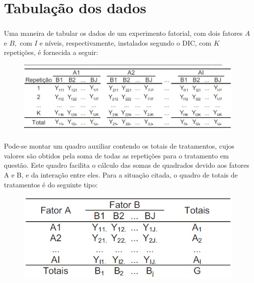 \documentclass[14pt,aspectratio=1610]{beamer}
\begin{document}
\section{Tabulação dos dados}
\begin{frame}{}
\frametitle{}
\begin{block}{}
\justifying
Uma maneira de tabular os dados de um experimento fatorial, com dois fatores
$A$ e $B,$ com $I$ e níveis, respectivamente, instalados segundo o DIC, com $K$
repetições, é fornecida a seguir:
\begin{figure}[H]
    \centering
    \includegraphics[scale=0.5]{Figuras/Tabulacao}
  \end{figure}
\end{block}
\end{frame}

\begin{frame}{}
\frametitle{}
\begin{block}{}
\justifying
Pode-se montar um quadro auxiliar contendo os totais de tratamentos,
cujos valores são obtidos pela soma de todas as repetições para o tratamento
em questão. Este quadro facilita o cálculo das somas de quadrados devido aos
fatores A e B, e da interação entre eles. Para a situação citada, o quadro de
totais de tratamentos é do seguinte tipo:
\begin{figure}[H]
    \centering
    \includegraphics[scale=0.5]{Figuras/Tabulacao2}
  \end{figure}
\end{block}
\end{frame}
\end{document}
